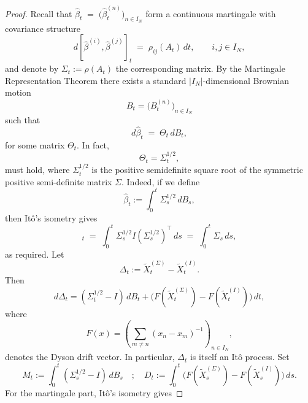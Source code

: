 \documentclass[12pt,reqno]{amsart}
\theoremstyle{plain}
\theoremstyle{definition}
\theoremstyle{remark}
\begin{document}
\begin{proof} 
Recall that $
\hat\beta_t \;=\; \bigl(\hat\beta^{(n)}_t\bigr)_{n\in I_N}$ form a continuous martingale with covariance structure
\begin{equation}
d[\hat\beta^{(i)},\hat\beta^{(j)}]_t \;=\; \rho_{ij}(A_t)\,dt ,
\qquad i,j\in I_N,
\end{equation}
and denote by $\Sigma_t := \rho(A_t)$ the corresponding matrix. By the Martingale Representation Theorem there exists a standard $|I_N|$-dimensional Brownian motion 
\begin{equation}
B_t = \bigl(B^{(n)}_t\bigr)_{n\in I_N}
\end{equation} such that
\begin{equation}\label{eq:beta-sigma-B}
d\hat\beta_t \;=\; \Theta_t \,dB_t ,
\end{equation}
for some matrix $\Theta_t$. In fact, 
\begin{equation} 
\Theta_t = \Sigma_t^{1/2},
\end{equation}
must hold, where $\Sigma_t^{1/2}$ is the positive semidefinite square root of the symmetric positive semi-definite matrix $\Sigma$. Indeed, if we define
\begin{equation}
\hat\beta_t := \int_0^t \Sigma_s^{1/2}\,dB_s ,
\end{equation}
then It\^o’s isometry gives
\begin{equation}
[\hat\beta,\hat\beta]_t \;=\; \int_0^t \Sigma_s^{1/2} I (\Sigma_s^{1/2})^\top \,ds
\;=\; \int_0^t \Sigma_s\,ds ,
\end{equation} as required. Let 
\begin{equation}
\Delta_t := \widetilde X^{(\Sigma)}_t - \widetilde X^{(I)}_t.
\end{equation} Then
\begin{equation}
d\Delta_t = (\Sigma_t^{1/2}-I)\,dB_t
+ \big(F(\widetilde X^{(\Sigma)}_t)-F(\widetilde X^{(I)}_t)\big)\,dt,
\end{equation}
where 
\begin{equation}
F(x)=\left (\sum_{m\neq n}(x_n-x_m)^{-1} \right)_{n \in I_N},
\end{equation}
denotes the Dyson drift vector. In particular, $\Delta_t$ is itself an It\^o process. Set
\begin{equation} 
M_t:=\int_0^t (\Sigma_s^{1/2}-I)\,dB_s \quad ; \quad
D_t:= \int_0^t \big(F(\widetilde X^{(\Sigma)}_s)-F(\widetilde X^{(I)}_s)\big)\,ds.
\end{equation}
For the martingale part, It\^o's isometry gives

\end{proof}
\end{document}
